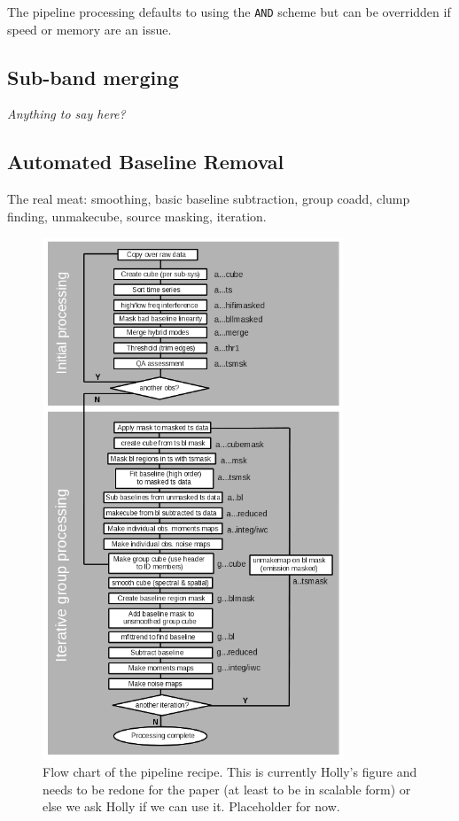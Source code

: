 \documentclass[final,authoryear,5p,times,twocolumn]{elsarticle}
\begin{document}
The pipeline processing defaults to using the \texttt{AND} scheme but
can be overridden if speed or memory are an issue.

\subsection{Sub-band merging}

\textit{Anything to say here?}

\subsection{Automated Baseline Removal}

The real meat: smoothing, basic baseline subtraction, group coadd,
clump finding, unmakecube, source masking, iteration.

\begin{figure}
\includegraphics[width=90mm]{flowchart.png}
\caption{Flow chart of the pipeline recipe. This is currently Holly's
  figure and needs to be redone for the paper (at least to be in
  scalable form) or else we ask Holly if we can use it. Placeholder
  for now.}
\label{fig:flowchart}
\end{figure}
\end{document}
